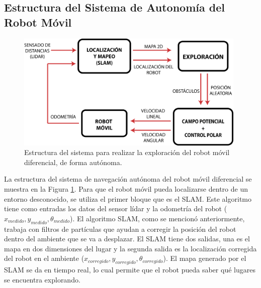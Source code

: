 

\subsection{Estructura del Sistema de Autonomía del Robot Móvil}
\label{sec:NavegacionAutonoma}
\begin{figure}%
	\centering \footnotesize
	\includegraphics[width=0.98\textwidth]{images/estructura_autonomia_1.png}
	\captionsetup{font=footnotesize}
	\caption{Estructura del sistema para realizar la exploración del robot móvil diferencial, de forma autónoma.}
	\label{fig:AutoSist}
\end{figure}

La estructura del sistema de navegación autónoma del robot móvil diferencial se muestra en la
Figura \ref{fig:AutoSist}. Para que el robot móvil pueda localizarse dentro de un entorno 
desconocido, se utiliza el primer bloque que es el SLAM. Este algoritmo tiene como entradas 
los datos del sensor lídar y la odometría del robot ($x_{medido}, y_{medido}, \theta_{medido}$). El
algoritmo SLAM, como se mencionó anteriormente, trabaja con filtros de partículas que ayudan 
a corregir la posición del robot dentro del ambiente que se va a desplazar. El SLAM tiene 
dos salidas, una es el mapa en dos dimensiones del lugar y la segunda salida es la localización
corregida del robot en el ambiente ($x_{corregido}, y_{corregido}, \theta_{corregido}$). El mapa
generado por el SLAM se da en tiempo real, lo cual permite que el robot pueda saber qué lugares se
encuentra explorando.

